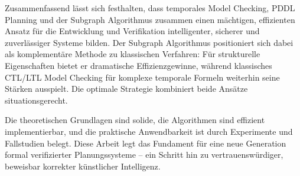 ﻿\documentclass[a4paper,12pt]{article}
\theoremstyle{definition}
\begin{document}
Zusammenfassend lässt sich festhalten, dass temporales Model Checking, PDDL Planning und der Subgraph Algorithmus zusammen einen mächtigen, effizienten Ansatz für die Entwicklung und Verifikation intelligenter, sicherer und zuverlässiger Systeme bilden. Der Subgraph Algorithmus positioniert sich dabei als komplementäre Methode zu klassischen Verfahren: Für strukturelle Eigenschaften bietet er dramatische Effizienzgewinne, während klassisches CTL/LTL Model Checking für komplexe temporale Formeln weiterhin seine Stärken ausspielt. Die optimale Strategie kombiniert beide Ansätze situationsgerecht.

Die theoretischen Grundlagen sind solide, die Algorithmen sind effizient implementierbar, und die praktische Anwendbarkeit ist durch Experimente und Fallstudien belegt. Diese Arbeit legt das Fundament für eine neue Generation formal verifizierter Planungssysteme -- ein Schritt hin zu vertrauenswürdiger, beweisbar korrekter künstlicher Intelligenz.
\end{document}
